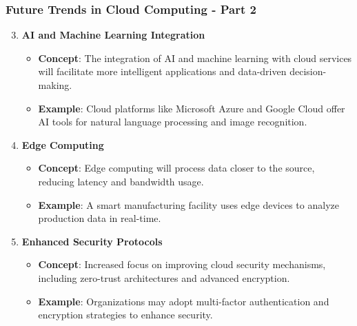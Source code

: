 \documentclass[aspectratio=169]{beamer}
\begin{document}
\begin{frame}[fragile]
    \frametitle{Future Trends in Cloud Computing - Part 2}
    \begin{enumerate}
        \setcounter{enumi}{2} %
        \item \textbf{AI and Machine Learning Integration}
        \begin{itemize}
            \item \textbf{Concept}: The integration of AI and machine learning with cloud services will facilitate more intelligent applications and data-driven decision-making.
            \item \textbf{Example}: Cloud platforms like Microsoft Azure and Google Cloud offer AI tools for natural language processing and image recognition.
        \end{itemize}

        \item \textbf{Edge Computing}
        \begin{itemize}
            \item \textbf{Concept}: Edge computing will process data closer to the source, reducing latency and bandwidth usage.
            \item \textbf{Example}: A smart manufacturing facility uses edge devices to analyze production data in real-time.
        \end{itemize}

        \item \textbf{Enhanced Security Protocols}
        \begin{itemize}
            \item \textbf{Concept}: Increased focus on improving cloud security mechanisms, including zero-trust architectures and advanced encryption.
            \item \textbf{Example}: Organizations may adopt multi-factor authentication and encryption strategies to enhance security.
        \end{itemize}
    \end{enumerate}
\end{frame}
\end{document}
